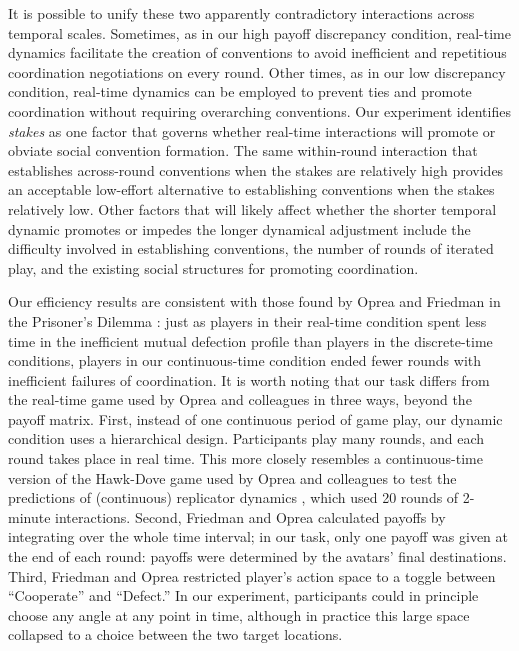 \documentclass[10pt,letterpaper]{article}
\begin{document}
It is possible to unify these two apparently contradictory interactions across temporal scales.  Sometimes, as in our high payoff discrepancy condition, real-time dynamics facilitate the creation of conventions to avoid inefficient and repetitious coordination negotiations on every round.  Other times, as in our low discrepancy condition, real-time dynamics can be employed to prevent ties and promote coordination without requiring overarching conventions.  Our experiment identifies \emph{stakes} as one factor that governs whether real-time interactions will promote or obviate social convention formation.  The same within-round interaction that establishes across-round conventions when the stakes are relatively high provides an acceptable low-effort alternative to establishing conventions when the stakes relatively low.  Other factors that will likely affect whether the shorter temporal dynamic promotes or impedes the longer dynamical adjustment include the difficulty involved in establishing conventions, the number of rounds of iterated play, and the existing social structures for promoting coordination.

Our efficiency results are consistent with those found by Oprea and Friedman in the Prisoner's Dilemma \cite{FriedmanOprea12_ContinuousDilemma}: just as players in their real-time condition spent less time in the inefficient mutual defection profile than players in the discrete-time conditions, players in our continuous-time condition ended fewer rounds with inefficient failures of coordination. It is worth noting that our task differs from the real-time game used by Oprea and colleagues in three ways, beyond the payoff matrix. First, instead of one continuous period of game play, our dynamic condition uses a hierarchical design. Participants play many rounds, and each round takes place in real time. This more closely resembles a continuous-time version of the Hawk-Dove game used by Oprea and colleagues to test the predictions of (continuous) replicator dynamics  \cite{OpreaHenwoodFriedman11_HawksDoves}, which used 20 rounds of 2-minute interactions. Second, Friedman and Oprea calculated payoffs by integrating over the whole time interval; in our task, only one payoff was given at the end of each round: payoffs were determined by the avatars' final destinations. Third, Friedman and Oprea restricted player's action space to a toggle between ``Cooperate'' and ``Defect.'' In our experiment, participants could in principle choose any angle at any point in time, although in practice this large space collapsed to a choice between the two target locations.
\end{document}
